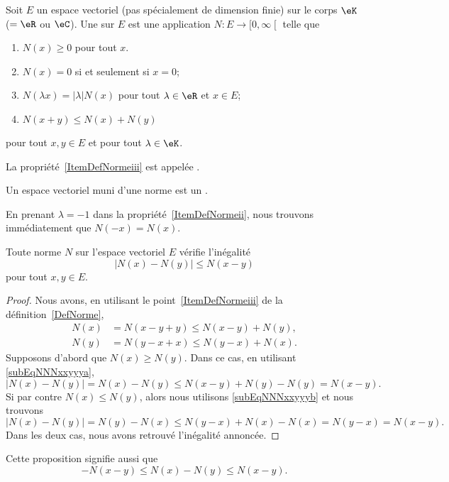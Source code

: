 \begin{definition}  \label{DefNorme}
	Soit \( E\) un espace vectoriel (pas spécialement de dimension finie) sur le corps \( \eK\) (\( =\eR\) ou \( \eC\)). Une   sur $E$ est une application $N\colon E\to\mathopen[ 0 , \infty \mathclose[$ telle que
	\begin{enumerate}
		\item
		      \( N(x)\geq 0\) pour tout \( x\).
		\item
		      \( N(x)=0\) si et seulement si \( x=0\);
		\item\label{ItemDefNormeii}
		      $N(\lambda x)=| \lambda |N(x)$ pour tout $\lambda\in\eR$ et $x\in E$;
		\item\label{ItemDefNormeiii}
		      $N(x+y)\leq N(x)+N(y)$
	\end{enumerate}
	pour tout $x,y\in E$ et pour tout $\lambda\in\eK$.

	La propriété~\ref{ItemDefNormeiii} est appelée .

	Un espace vectoriel muni d'une norme est un .
\end{definition}
En prenant $\lambda=-1$ dans la propriété~\ref{ItemDefNormeii}, nous trouvons immédiatement que $N(-x)=N(x)$.

\begin{proposition}		\label{PropNmNNm}
	Toute norme $N$ sur l'espace vectoriel $E$ vérifie l'inégalité
	\begin{equation}
		\big| N(x)-N(y) \big|\leq N(x-y)
	\end{equation}
	pour tout $x,y\in E$.
\end{proposition}

\begin{proof}
	Nous avons, en utilisant le point~\ref{ItemDefNormeiii} de la définition~\ref{DefNorme},
	\begin{subequations}
		\begin{align}
			N(x) & =N(x-y+y)\leq N(x-y)+N(y),	\label{subEqNNNxxyyya} \\
			N(y) & =N(y-x+x)\leq N(y-x)+N(x).	\label{subEqNNNxxyyyb}
		\end{align}
	\end{subequations}
	Supposons d'abord que $N(x)\geq N(y)$. Dans ce cas, en utilisant \eqref{subEqNNNxxyyya},
	\begin{equation}
		\big| N(x)-N(y) \big|=N(x)-N(y)\leq N(x-y)+N(y)-N(y)=N(x-y).
	\end{equation}
	Si par contre $N(x)\leq N(y)$, alors nous utilisons \eqref{subEqNNNxxyyyb} et nous trouvons
	\begin{equation}
		\big| N(x)-N(y) \big|=N(y)-N(x)\leq N(y-x)+N(x)-N(x)=N(y-x)=N(x-y).
	\end{equation}
	Dans les deux cas, nous avons retrouvé l'inégalité annoncée.
\end{proof}
Cette proposition signifie aussi que
\begin{equation}	\label{EqNleqNNleqNvqlqbs}
	-N(x-y)\leq N(x)-N(y)\leq N(x-y).
\end{equation}

